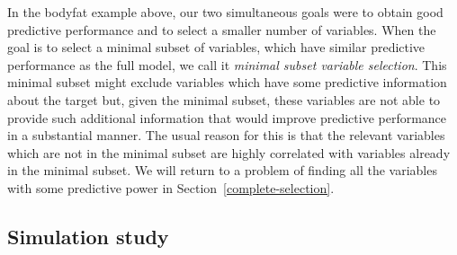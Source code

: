 \documentclass[a4]{article}
\theoremstyle{definition}
\begin{document}
In the bodyfat example above, our two simultaneous goals were to 
obtain good predictive performance and to select a smaller number of variables. 
When the goal is to select a minimal subset of variables,
which have similar predictive performance as the full model, we call it
\emph{minimal subset variable selection}. This minimal subset might
exclude variables which have some predictive information about the
target but, given the minimal subset, these variables are not able to
provide such additional information that would improve predictive
performance in a substantial manner.
The usual reason for this is that the relevant variables
which are not in the minimal subset are highly correlated with variables already in
the minimal subset. We will return to a problem of finding all
the variables with some predictive power in Section~\ref{complete-selection}.

\subsection{Simulation study}
\end{document}
